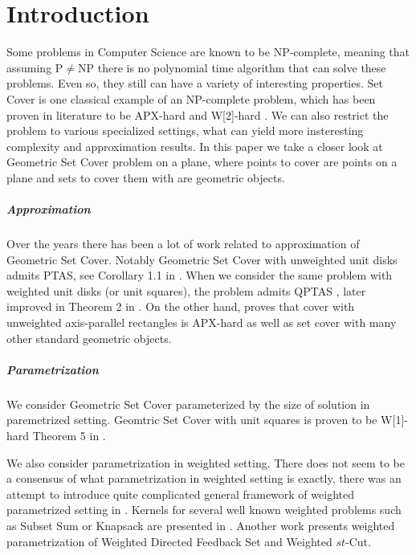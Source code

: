 \chapter{Introduction}

Some problems in Computer Science are known to be NP-complete,
meaning that assuming P$\neq$NP there is no polynomial time
algorithm that can solve these problems.
Even so, they still can have a variety of interesting properties.
Set Cover is one classical example of an NP-complete problem,
which has been proven
in literature to be APX-hard and W[2]-hard \cite{platypus_book}.
We can also restrict the problem to various specialized settings,
what can yield more insteresting complexity and approximation results.
In this paper we take a closer look at Geometric Set Cover problem
on a plane, where points to cover are points on a plane
and sets to cover them with are geometric objects.

\paragraph{Approximation}
Over the years there has been a lot of work related to approximation
of Geometric Set Cover. Notably 
Geometric Set Cover with unweighted unit disks admits PTAS, see
Corollary 1.1 in \cite{unit_disks}. When we consider the same problem
with weighted unit disks (or unit squares), the problem admits QPTAS
\cite{settling_apx_hardness}, later improved in
Theorem 2 in \cite{voronoi_true}.
On the other hand, \cite{rectangles_apx_hard} 
proves that cover with unweighted axis-parallel rectangles
is APX-hard as well as set cover with many other
standard geometric objects.

\paragraph{Parametrization}
We consider Geometric Set Cover 
parameterized by the size of solution in paremetrized setting.
Geomtric Set Cover with unit squares is proven to be W[1]-hard 
Theorem 5 in \cite{marx05}.

We also consider parametrization in weighted setting.
There does not seem to be a consensus of what parametrization
in weighted setting is exactly, there
was an attempt to introduce quite complicated general
framework of weighted parametrized setting in \cite{weighted_framework}.
Kernels for several well known weighted problems
such as Subset Sum or Knapsack are presented in \cite{kernel_weighted}.
Another work \cite{weighted_flow} presents weighted
parametrization of Weighted Directed Feedback Set and Weighted $st$-Cut.

